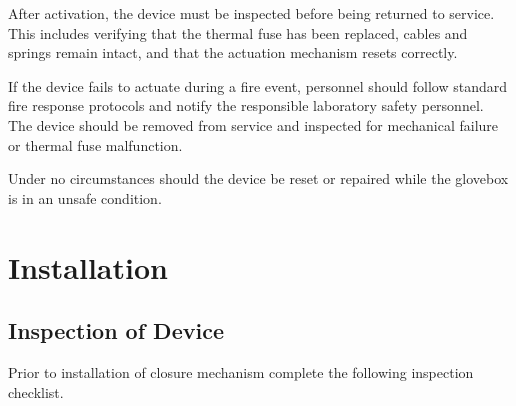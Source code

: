 \documentclass[12pt, a4paper]{report}
\begin{document}
    After activation, the device must be inspected before being returned to service. This includes verifying that the thermal fuse has been replaced, cables and springs remain intact, and that the actuation mechanism resets correctly.

    If the device fails to actuate during a fire event, personnel should follow standard fire response protocols and notify the responsible laboratory safety personnel. The device should be removed from service and inspected for mechanical failure or thermal fuse malfunction.

    Under no circumstances should the device be reset or repaired while the glovebox is in an unsafe condition.

\chapter{Installation}

\section{Inspection of Device}

Prior to installation of closure mechanism complete the following inspection checklist. 
\end{document}
